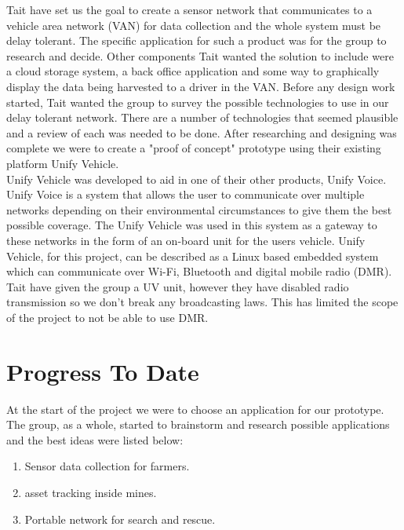 \documentclass[a4paper,12pt]{article}
\begin{document}
Tait have set us the goal to create a sensor network that communicates to a vehicle area network (VAN) for data collection and the whole system must be delay tolerant. The specific application for such a product was for the group to research and decide. Other components Tait wanted the solution to include were a cloud storage system, a back office application and some way to graphically display the data being harvested to a driver in the VAN. Before any design work started, Tait wanted the group to survey the possible technologies to use in our delay tolerant network. There are a number of technologies that seemed plausible and a review of each was needed to be done. After researching and designing was complete we were to create a "proof of concept" prototype using their existing platform Unify Vehicle.\\

Unify Vehicle was developed to aid in one of their other products, Unify Voice. Unify Voice is a system that allows the user to communicate over multiple networks depending on their environmental circumstances to give them the best possible coverage. The Unify Vehicle was used in this system as a gateway to these networks in the form of an on-board unit for the users vehicle. Unify Vehicle, for this project, can be described as a Linux based embedded system which can communicate over Wi-Fi, Bluetooth and digital mobile radio (DMR). Tait have given the group a UV unit, however they have disabled radio transmission so we don't break any broadcasting laws. This has limited the scope of the project to not be able to use DMR. \\


\clearpage

\section{Progress To Date}

At the start of the project we were to choose an application for our prototype. The group, as a whole, started to brainstorm and research possible applications and the best ideas were listed below:

\begin{enumerate}
\item Sensor data collection for farmers.
\item asset tracking inside mines.
\item Portable network for search and rescue.
\end{enumerate}
\end{document}
